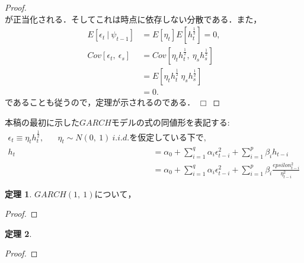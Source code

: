 \documentclass[8pt]{jsarticle}
\newtheorem{prop}{定理}
\newtheorem{proof}{証明}
\def\qed{\hfill $\Box$}
\begin{document}
\begin{proof}
\[\]
が正当化される．そしてこれは時点に依存しない分散である．また，
\begin{align*}
	E[\epsilon_t\ |\ \psi_{t-1}] &= E[\eta_t]E[h_t^\frac{1}{2}] = 0,\\
	Cov[\epsilon_t,\ \epsilon_s] &= Cov[\eta_t h_t^\frac{1}{2},\ \eta_s h_s^\frac{1}{2}] \\
	&= E[\eta_t h_t^\frac{1}{2}\ \eta_s h_s^\frac{1}{2}] \\
	&= 0.
\end{align*}
であることも従うので，定理が示されるのである．
\qed
\end{proof}

本稿の最初に示した$GARCH$モデルの式の同値形を表記する:
\begin{align*}
	\epsilon_t \equiv \eta_t h_t^{\frac{1}{2}}, \hspace{20pt} \eta_t \sim N(0,\ 1)\ i.i.d. \mbox{を仮定している下で,}\\
	h_t &= \alpha_0 + \sum_{i=1}^{q} \alpha_i \epsilon_{t-i}^2 + \sum_{i=1}^{p} \beta_i h_{t-i} \\
	&= \alpha_0 + \sum_{i=1}^{q} \alpha_i \epsilon_{t-i}^2 + \sum_{i=1}^{p} \beta_i \frac{epsilon_{t-i}^2}{\eta_{t-i}^2}
\end{align*}

\begin{boxnote}
	\begin{prop}
	$GARCH(1,\ 1)について，$
	\end{prop}
\end{boxnote}
\begin{proof}
\end{proof}

\begin{boxnote}
	\begin{prop}
	
	\end{prop}
\end{boxnote}
\begin{proof}
\end{proof}
\end{document}
